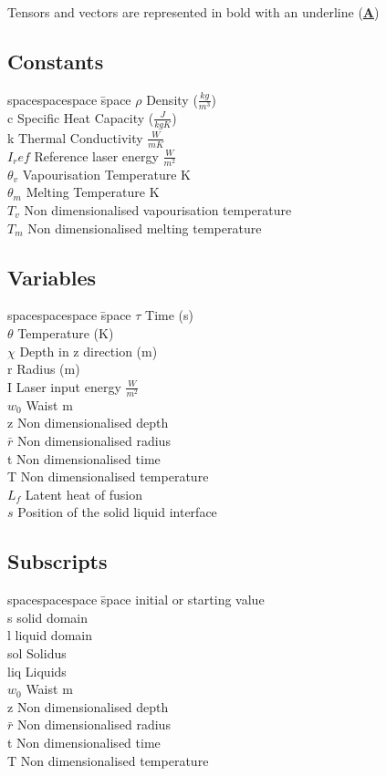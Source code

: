 Tensors and vectors are represented in bold with an underline (\textbf{\underline{A}})
\subsection{Constants}
\begin{tabbing}
spacespacespace \= space \kill
$\rho$	 \> 	Density ($\frac{kg}{m^3}$)	 \\
c	\>	Specific Heat Capacity ($\frac{J}{kg K}$)\\
k	 \> 	Thermal Conductivity $\frac{W}{m K}$ \\
$I_ref$	\>	Reference laser energy $\frac{W}{m^2}$ \\
$\theta_v$	\>	Vapourisation Temperature K \\
$\theta_m$	\>	Melting Temperature K \\
$ T_v $	\>	Non dimensionalised vapourisation temperature \\
$ T_m$	\>	Non dimensionalised melting temperature \\
\end{tabbing}
\subsection{Variables}
\begin{tabbing}
spacespacespace \= space \kill
$\tau$	 \> 	Time (s)	 \\
$\theta$	\>	Temperature (K) \\
$\chi$	\>	Depth in z direction (m) \\
r	\>	Radius (m) \\
I	\>	Laser input energy $\frac{W}{m^2}$ \\
$w_0$	\>	Waist m\\
z	\>	Non dimensionalised depth \\
$\bar{r}$	\>	Non dimensionalised radius \\
t	\>	Non dimensionalised time\\
T	\>	Non dimensionalised temperature \\
$L_f$ \> Latent heat of fusion \\
$s$ \> Position of the solid liquid interface\\
\end{tabbing}
\subsection{Subscripts}
\begin{tabbing}
spacespacespace \= space 	 \> 	initial or starting value\\
s	\>	solid domain\\
l	\>	liquid domain \\
sol	\>	Solidus \\
liq	\>	Liquids  \\
$w_0$	\>	Waist m\\
z	\>	Non dimensionalised depth \\
$ \bar{r} $	\>	Non dimensionalised radius \\
t	\>	Non dimensionalised time\\
T	\>	Non dimensionalised temperature \\
\end{tabbing}
\endinput
